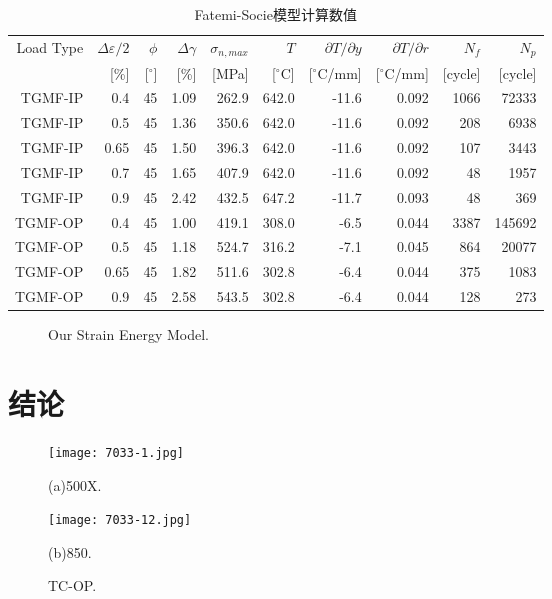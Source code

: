 \begin{table}[htbp]
  \centering
  \caption{Fatemi-Socie模型计算数值}
    \begin{tabular}{rrrrrrrrrr}
    \toprule
    Load Type & $\Delta\varepsilon/2$ & $\phi$ & $\Delta\gamma$ & $\sigma_{n,max}$ & $T$   & $\partial T/\partial y$ & $\partial T/\partial r$ & $N_f$ & $N_p$ \\
          & [\%]  & [$^{\circ}$] & [\%]  & [MPa] & [$^{\circ}$C] & [$^{\circ}$C/mm] & [$^{\circ}$C/mm] & [cycle] & [cycle] \\
    \midrule
    TGMF-IP & 0.4   & 45    & 1.09  & 262.9  & 642.0  & -11.6  & 0.092  & 1066  & 72333 \\
    TGMF-IP & 0.5   & 45    & 1.36  & 350.6  & 642.0  & -11.6  & 0.092  & 208   & 6938 \\
    TGMF-IP & 0.65  & 45    & 1.50  & 396.3  & 642.0  & -11.6  & 0.092  & 107   & 3443 \\
    TGMF-IP & 0.7   & 45    & 1.65  & 407.9  & 642.0  & -11.6  & 0.092  & 48    & 1957 \\
    TGMF-IP & 0.9   & 45    & 2.42  & 432.5  & 647.2  & -11.7  & 0.093  & 48    & 369 \\
    TGMF-OP & 0.4   & 45    & 1.00  & 419.1  & 308.0  & -6.5  & 0.044  & 3387  & 145692 \\
    TGMF-OP & 0.5   & 45    & 1.18  & 524.7  & 316.2  & -7.1  & 0.045  & 864   & 20077 \\
    TGMF-OP & 0.65  & 45    & 1.82  & 511.6  & 302.8  & -6.4  & 0.044  & 375   & 1083 \\
    TGMF-OP & 0.9   & 45    & 2.58  & 543.5  & 302.8  & -6.4  & 0.044  & 128   & 273 \\
    \bottomrule
    \end{tabular}%
  \label{Tab:FatigueCoefficient}%
\end{table}%

\begin{figure}[!htp]
\caption{Our Strain Energy Model.}
\label{Fig:NF-NP-TGMF-Our}
\end{figure}

\section{结论}

\begin{figure}
  \begin{minipage}[t]{0.5\linewidth}
  \nonumber
    \centering
    \texttt{[image: 7033-1.jpg]}
    \centerline{(a)500X.}
  \end{minipage}%
  \begin{minipage}[t]{0.5\linewidth}
    \centering
    \texttt{[image: 7033-12.jpg]}
    \centerline{(b)850.}
  \end{minipage}
  \caption{TC-OP.}
  \label{Fig:MicrostructureofInconel718}
\end{figure}

